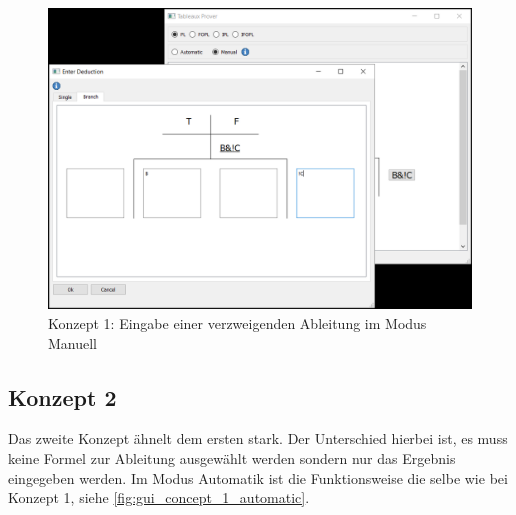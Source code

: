\begin{figure}[h]
\begin{center}
\includegraphics[scale=0.7]{images/gui_concept_1_manual_enter_branch.png}
\caption{Konzept 1: Eingabe einer verzweigenden Ableitung im Modus Manuell}
\label{fig:gui_concept_1_manual_enter_branch}
\end{center}
\end{figure}

\subsection{Konzept 2}
Das zweite Konzept ähnelt dem ersten stark. Der Unterschied hierbei ist, es muss keine Formel zur Ableitung ausgewählt werden sondern nur das Ergebnis eingegeben werden. Im Modus Automatik ist die Funktionsweise die selbe wie bei Konzept 1, siehe \autoref{fig:gui_concept_1_automatic}.

